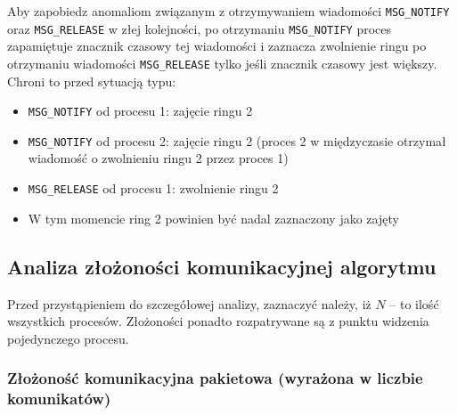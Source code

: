 \documentclass{article}
\begin{document}
Aby zapobiedz anomaliom związanym z otrzymywaniem wiadomości
\verb|MSG_NOTIFY| oraz \verb|MSG_RELEASE| w złej kolejności, po
otrzymaniu \verb|MSG_NOTIFY| proces zapamiętuje znacznik czasowy tej
wiadomości i zaznacza zwolnienie ringu po otrzymaniu wiadomości \verb|MSG_RELEASE|
tylko jeśli znacznik czasowy jest większy. Chroni to przed sytuacją
typu:
\begin{itemize}
    \item \verb|MSG_NOTIFY| od procesu 1: zajęcie ringu 2
    \item \verb|MSG_NOTIFY| od procesu 2: zajęcie ringu 2 (proces 2 w
    międzyczasie otrzymał wiadomość o zwolnieniu ringu 2 przez proces 1)
    \item \verb|MSG_RELEASE| od procesu 1: zwolnienie ringu 2
    \item W tym momencie ring 2 powinien być nadal zaznaczony jako
    zajęty
\end{itemize}



\subsection{Analiza złożoności komunikacyjnej algorytmu}

Przed przystąpieniem do szczegółowej analizy, zaznaczyć należy, iż $N$ --
to ilość wszystkich procesów. Złożoności ponadto rozpatrywane są z punktu
widzenia pojedynczego procesu.

\subsubsection{Złożoność komunikacyjna pakietowa (wyrażona w liczbie komunikatów)}
\end{document}
